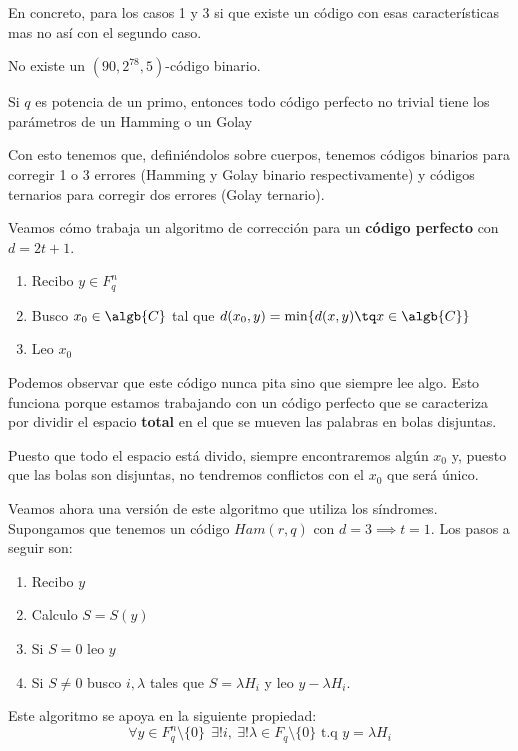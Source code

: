 En concreto, para los casos 1 y 3 si que existe un código con esas características mas no así con el segundo caso.

\begin{theorem}
No existe un $(90,2^{78},5)$-código binario.
\end{theorem}

\begin{theorem}
Si $q$ es potencia de un primo, entonces todo código perfecto no trivial tiene los parámetros de un Hamming o un Golay
\end{theorem}

Con esto tenemos que, definiéndolos sobre cuerpos, tenemos códigos binarios para corregir 1 o 3 errores (Hamming y Golay binario respectivamente) y códigos ternarios para corregir dos errores (Golay ternario).

Veamos cómo trabaja un algoritmo de corrección para un \textbf{código perfecto} con $d=2t+1$.

\begin{enumerate}
\item Recibo $y\in F_q^n$
\item Busco $x_0 \in \algb{C}$ tal que $d(x_0,y)=\min\{d(x,y)\tq x \in \algb{C}\}$
\item Leo $x_0$
\end{enumerate}

Podemos observar que este código nunca pita sino que siempre lee algo. Esto funciona porque estamos trabajando con un código perfecto que se caracteriza por dividir el espacio \textbf{total} en el que se mueven las palabras en bolas disjuntas.

Puesto que todo el espacio está divido, siempre encontraremos algún $x_0$ y, puesto que las bolas son disjuntas, no tendremos conflictos con el $x_0$ que será único.

Veamos ahora una versión de este algoritmo que utiliza los síndromes. Supongamos que tenemos un código $Ham(r,q)$ con $d=3 \implies t=1$. Los pasos a seguir son:

\begin{enumerate}
\item Recibo $y$
\item Calculo $S=S(y)$
\item Si $S=0$ leo $y$
\item Si $S\neq 0$ busco $i,λ$ tales que $S=λH_i$ y leo $y-λH_i$.
\end{enumerate}

Este algoritmo se apoya en la siguiente propiedad:
\[\forall y \in F_q^n\setminus \{0\} \ \ \exists ! i, \ \exists ! λ\in F_q\setminus\{0\} \text{ t.q } y=λH_i\]

